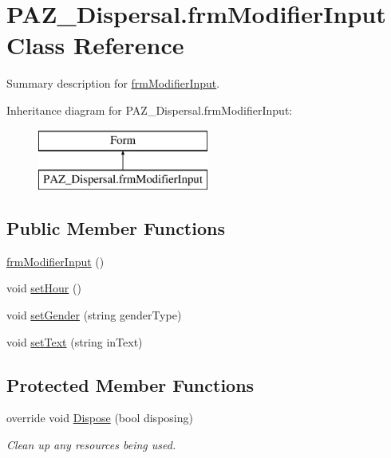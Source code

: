 \hypertarget{class_p_a_z___dispersal_1_1frm_modifier_input}{\section{P\-A\-Z\-\_\-\-Dispersal.\-frm\-Modifier\-Input Class Reference}
\label{class_p_a_z___dispersal_1_1frm_modifier_input}
}


Summary description for \hyperlink{class_p_a_z___dispersal_1_1frm_modifier_input}{frm\-Modifier\-Input}.  


Inheritance diagram for P\-A\-Z\-\_\-\-Dispersal.\-frm\-Modifier\-Input\-:\begin{figure}[H]
\begin{center}
\leavevmode
\includegraphics[height=2.000000cm]{class_p_a_z___dispersal_1_1frm_modifier_input}
\end{center}
\end{figure}
\subsection*{Public Member Functions}
\begin{DoxyCompactItemize}
\item 
\hyperlink{class_p_a_z___dispersal_1_1frm_modifier_input_ad2fcce44a97338d1d8192b466f27b899}{frm\-Modifier\-Input} ()
\item 
void \hyperlink{class_p_a_z___dispersal_1_1frm_modifier_input_aa0af7f780cd7bf367e942d3d6b2ffd4d}{set\-Hour} ()
\item 
void \hyperlink{class_p_a_z___dispersal_1_1frm_modifier_input_a1317a0d5e97d0ecad556b4bc3a09ca2c}{set\-Gender} (string gender\-Type)
\item 
void \hyperlink{class_p_a_z___dispersal_1_1frm_modifier_input_aa40034d721028a26fa8408a746afe5ab}{set\-Text} (string in\-Text)
\end{DoxyCompactItemize}
\subsection*{Protected Member Functions}
\begin{DoxyCompactItemize}
\item 
override void \hyperlink{class_p_a_z___dispersal_1_1frm_modifier_input_a1a738c73a6031c46989753804d76b138}{Dispose} (bool disposing)
\begin{DoxyCompactList}\small\item\em Clean up any resources being used. \end{DoxyCompactList}\end{DoxyCompactItemize}
